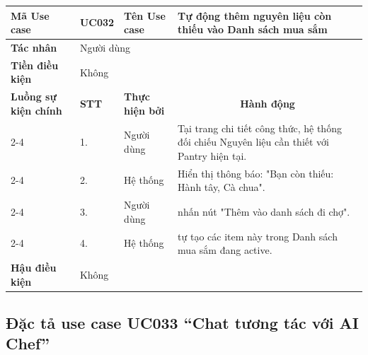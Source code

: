 \documentclass[../main.tex]{subfiles}
\begin{document}
\begin{longtable}{|p{2.7cm}|p{0.8cm}|p{2.6cm}|p{7.3cm}|}
\hline
\cellcolor[HTML]{D5F5E3}\textbf{Mã Use case} & \multicolumn{1}{l|}{UC032} & \cellcolor[HTML]{D5F5E3}\textbf{Tên Use case} & Tự động thêm nguyên liệu còn thiếu vào Danh sách mua sắm \\ \hline
\cellcolor[HTML]{D5F5E3}\textbf{Tác nhân} & \multicolumn{3}{p{10.7cm}|}{Người dùng} \\ \hline
\cellcolor[HTML]{D5F5E3}\textbf{Tiền điều kiện} & \multicolumn{3}{p{10.7cm}|}{Không} \\ \hline

\cellcolor[HTML]{D5F5E3}\textbf{Luồng sự kiện chính} & \cellcolor[HTML]{FDEBD0}\textbf{STT} & \cellcolor[HTML]{FDEBD0}\textbf{Thực hiện bởi} & \multicolumn{1}{c|}{\cellcolor[HTML]{FDEBD0}\textbf{Hành động}} \\ \cline{2-4} 
\cellcolor[HTML]{D5F5E3} & 1. & Người dùng & Tại trang chi tiết công thức, hệ thống đối chiếu Nguyên liệu cần thiết với Pantry hiện tại. \\ \cline{2-4} 
\cellcolor[HTML]{D5F5E3} & 2. & Hệ thống & Hiển thị thông báo: "Bạn còn thiếu: Hành tây, Cà chua". \\ \cline{2-4} 
\cellcolor[HTML]{D5F5E3} & 3. & Người dùng & nhấn nút "Thêm vào danh sách đi chợ". \\ \cline{2-4} 
\cellcolor[HTML]{D5F5E3} & 4. & Hệ thống & tự tạo các item này trong Danh sách mua sắm đang active. \\ \hline

\cellcolor[HTML]{D5F5E3}\textbf{Hậu điều kiện} & \multicolumn{3}{p{10.7cm}|}{Không} \\ \hline
\end{longtable}
\endgroup

\subsection{Đặc tả use case UC033 ``Chat tương tác với AI Chef''}
\vspace{0.5cm}

\begingroup
\renewcommand{\arraystretch}{1.5}
\end{document}
